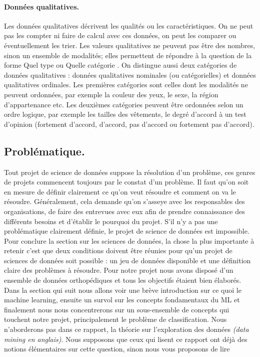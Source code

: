 \documentclass[12pt, french]{report}
\begin{document}
\paragraph{Données qualitatives.} 
Les données qualitatives décrivent les qualités ou les caractéristiques. On ne peut pas les compter ni faire de calcul avec ces données, on peut les comparer ou éventuellement les trier. Les valeurs qualitatives ne peuvent pas être des nombres, sinon un ensemble de modalités; elles permettent de répondre à la question de la forme \guillemotleft Quel type \guillemotright ou \guillemotleft Quelle catégorie \guillemotright. On distingue aussi deux catégories de données qualitatives : données qualitatives nominales (ou catégorielles) et données qualitatives ordinales. Les premières catégories sont celles dont les modalités ne peuvent ordonnées, par exemple la couleur des yeux, le sexe, la région d'appartenance etc. Les deuxièmes catégories peuvent être ordonnées selon un ordre logique, par exemple les tailles des vêtements, le degré d'accord à un test d'opinion (fortement d'accord, d'accord, pas d'accord ou fortement pas d'accord). \cite[p.~12]{key44}

\subsection{Problématique.}
Tout projet de science de données suppose la résolution d'un problème, ces genres de projets commencent toujours par le constat d'un problème. Il faut qu'on soit en mesure de définir clairement ce qu'on veut résoudre et comment on va le résoudre. Généralement, cela demande qu'on s'asseye avec les responsables des organisations, de faire des entrevues avec eux afin de prendre connaissance des différents besoins et d'établir le pourquoi du projet. S'il n'y a pas une problématique clairement définie, le projet de science de données est impossible. \\

Pour conclure la section sur les sciences de données, la chose la plus importante à retenir c'est que deux conditions doivent être réunies pour qu'un projet de sciences de données soit possible : un jeu de données disponible et une définition claire des problèmes à résoudre. Pour notre projet nous avons disposé d'un ensemble de données orthopédiques et tous les objectifs étaient bien élaborés. \\

Dans la section qui suit nous allons voir une brève introduction sur ce quoi le machine learning, ensuite un survol sur les concepts fondamentaux du ML et finalement nous nous concentrerons sur un sous-ensemble de concepts qui touchent notre projet, principalement le problème de classification. Nous n'aborderons pas dans ce rapport, la théorie sur l'exploration des données \textit{(data mining en anglais)}. Nous supposons que ceux qui lisent ce rapport ont déjà des notions élémentaires sur cette question, sinon nous vous proposons de lire \cite{key46, key47}
\end{document}
